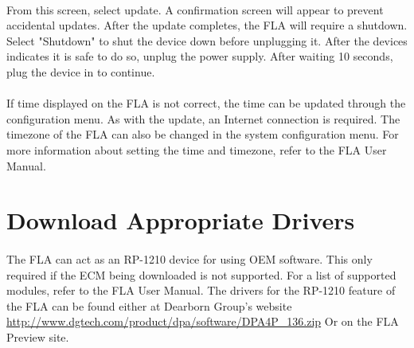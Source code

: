 \documentclass[11pt, oneside]{book}
\begin{document}
\\[\baselineskip]
From this screen, select update. A confirmation screen will appear to prevent accidental updates.\newline
After the update completes, the FLA will require a shutdown. Select "Shutdown" to shut the device down before unplugging it. After the devices indicates it is safe to do so, unplug the power supply. After waiting 10 seconds, plug the device in to continue.
\paragraph{  }
If time displayed on the FLA is not correct, the time can be updated through the configuration menu. As with the update, an Internet connection is required. The timezone of the FLA can also be changed in the system configuration menu. For more information about setting the time and timezone, refer to the FLA User Manual.
\section{Download Appropriate Drivers}
\paragraph{  }
The FLA can act as an RP-1210 device for using OEM software. This only required if the ECM being downloaded is not supported. For a list of supported modules, refer to the FLA User Manual. The drivers for the RP-1210 feature of the FLA can be found either at Dearborn Group's website
\url{http://www.dgtech.com/product/dpa/software/DPA4P_136.zip} 
Or on the FLA Preview site.
\end{document}

